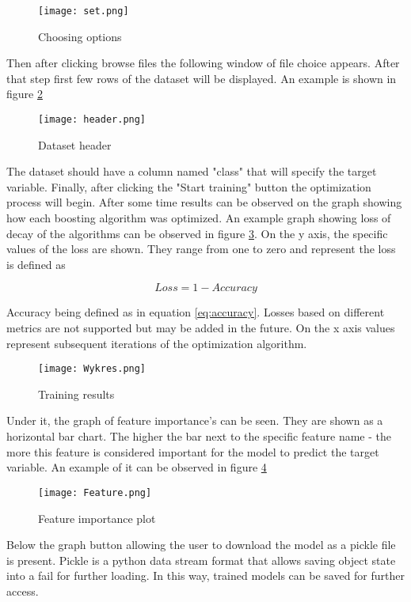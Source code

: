 \documentclass[a4paper,twoside,12pt]{book}
\begin{document}
\begin{figure}[!htb]
    \centering
    \texttt{[image: set.png]}
    \caption{Choosing options}
    \label{fig:set}
\end{figure}

Then after clicking browse files the following window of file choice appears.
After that step first few rows of the dataset will be displayed. An example is shown in figure \ref{fig:header}

\begin{figure}[!htb]
    \centering
    \texttt{[image: header.png]}
    \caption{Dataset header}
    \label{fig:header}
\end{figure}

The dataset should have a column named "class" that will specify the target variable.
Finally, after clicking the "Start training" button the optimization process will begin. After some time results can be observed on the graph showing how each boosting algorithm was optimized. An example graph showing loss of decay of the algorithms can be observed in figure \ref{fig:wykres}.
On the y axis, the specific values of the loss are shown. They range from one to zero and represent the loss is defined as

\begin{equation}
Loss = 1 - Accuracy
\end{equation}

Accuracy being defined as in equation \ref{eq:accuracy}.
Losses based on different metrics are not supported but may be added in the future.
On the x axis values represent subsequent iterations of the optimization algorithm.
\begin{figure}[!htb]
    \centering
    \texttt{[image: Wykres.png]}
    \caption{Training results}
    \label{fig:wykres}
\end{figure}

Under it, the graph of feature importance's can be seen. They are shown as a horizontal bar chart. The higher the bar next to the specific feature name - the more this feature is considered important for the model to predict the target variable. An example of it can be observed in figure \ref{fig:feature} 

\begin{figure}[!htb]
    \centering
    \texttt{[image: Feature.png]}
    \caption{Feature importance plot}
    \label{fig:feature}
\end{figure}


Below the graph button allowing the user to download the model as a pickle file is present.
Pickle is a python data stream format that allows saving object state into a fail for further loading. In this way, trained models can be saved for further access.
\end{document}
